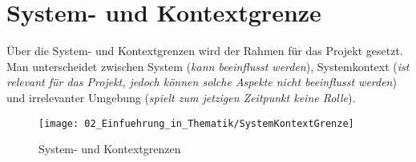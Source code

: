 \section{System- und Kontextgrenze} \label{SystemKontextGrenze}

Über die System- und Kontextgrenzen wird der Rahmen für das Projekt gesetzt. Man unterscheidet zwischen System (\textit{kann beeinflusst werden}), Systemkontext (\textit{ist relevant für das Projekt, jedoch können solche Aspekte nicht beeinflusst werden}) und irrelevanter Umgebung (\textit{spielt zum jetzigen Zeitpunkt keine Rolle}).

\begin{figure}[h!]
	\centering
	\texttt{[image: 02\_Einfuehrung\_in\_Thematik/SystemKontextGrenze]}
	\captionsetup{justification=centering}
	\caption{System- und Kontextgrenzen}
	\label{fig:SystemKontextGrenze}
\end{figure}

\newpage